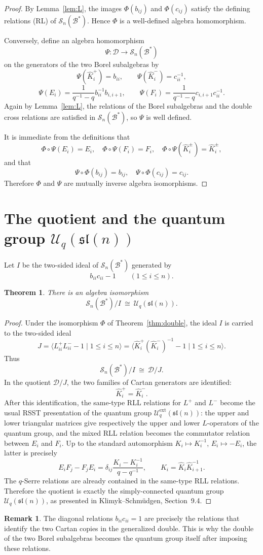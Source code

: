\documentclass{article}
\newtheorem{theorem}{Theorem}
\theoremstyle{definition}
\newtheorem{remark}{Remark}
\newcommand{\Uc}{\mathcal{U}}
\newcommand{\bcS}{\mathcal{S}}
\newcommand{\fB}{\mathcal{B}}
\newcommand{\fD}{\mathcal{D}}
\newcommand{\la}{\langle}
\newcommand{\ra}{\rangle}
\newcommand{\Khat}{\widehat K}
\newcommand{\q}{q}
\begin{document}
\begin{proof}
By Lemma~\ref{lem:L}, the images $\Phi(b_{ij})$ and $\Phi(c_{ij})$
satisfy the defining relations (RL) of $\bcS_n(\fB^*)$. Hence
$\Phi$ is a well-defined algebra homomorphism.

Conversely, define an algebra homomorphism
\[
\Psi:\fD\longrightarrow \bcS_n(\fB^*)
\]
on the generators of the two Borel subalgebras by
\[
\Psi(\Khat_i^+)=b_{ii},\qquad
\Psi(\Khat_i^-)=c_{ii}^{-1},
\]
\[
\Psi(E_i)=\frac{1}{\q^{-1}-\q} b_{ii}^{-1}b_{i,i+1},
\qquad
\Psi(F_i)=\frac{1}{\q^{-1}-\q} c_{i,i+1}c_{ii}^{-1}.
\]
Again by Lemma~\ref{lem:L}, the relations of the Borel subalgebras
and the double cross relations are satisfied in $\bcS_n(\fB^*)$, so
$\Psi$ is well defined.

It is immediate from the definitions that
\[
\Phi\circ \Psi(E_i)=E_i,\quad
\Phi\circ \Psi(F_i)=F_i,\quad
\Phi\circ \Psi(\Khat_i^\pm)=\Khat_i^\pm,
\]
and that
\[
\Psi\circ \Phi(b_{ij})=b_{ij},\quad
\Psi\circ \Phi(c_{ij})=c_{ij}.
\]
Therefore $\Phi$ and $\Psi$ are mutually inverse algebra isomorphisms.
\end{proof}

\section{The quotient and the quantum group $\Uc_q(\mathfrak{sl}(n))$}

Let $I$ be the two-sided ideal of $\bcS_n(\fB^*)$ generated by
\[
b_{ii}c_{ii}-1\qquad (1\leq i\leq n).
\]

\begin{theorem}\label{thm:quotient}
There is an algebra isomorphism
\[
\bcS_n(\fB^*)/I\ \cong\ \Uc_q(\mathfrak{sl}(n)).
\]
\end{theorem}

\begin{proof}
Under the isomorphism $\Phi$ of Theorem~\ref{thm:double}, the ideal
$I$ is carried to the two-sided ideal
\[
J=\bigl\la L^+_{ii}L^-_{ii}-1\mid 1\leq i\leq n\bigr\ra
=\bigl\la \Khat_i^+(\Khat_i^-)^{-1}-1\mid 1\leq i\leq n\bigr\ra.
\]
Thus
\[
\bcS_n(\fB^*)/I\ \cong\ \fD/J.
\]
In the quotient $\fD/J$, the two families of Cartan generators are
identified:
\[
\Khat_i^+=\Khat_i^-.
\]
After this identification, the same-type RLL relations for $L^+$ and
$L^-$ become the usual RSST presentation of the quantum group
$\Uc_q^{\mathrm{ext}}(\mathfrak{sl}(n))$: the upper and lower
triangular matrices give respectively the upper and lower
$L$-operators of the quantum group, and the mixed RLL relation becomes
the commutator relation between $E_i$ and $F_i$. Up to the standard
automorphism $K_i\mapsto K_i^{-1}$, $E_i\mapsto -E_i$, the latter is
precisely
\[
E_iF_j-F_jE_i
=\delta_{ij}\frac{K_i-K_i^{-1}}{\q-\q^{-1}},
\qquad
K_i=\Khat_i\Khat_{i+1}^{-1}.
\]
The $q$-Serre relations are already contained in the same-type RLL
relations. Therefore the quotient is exactly the simply-connected
quantum group $\Uc_q(\mathfrak{sl}(n))$, as presented in
Klimyk--Schm\"udgen, Section~9.4.
\end{proof}

\begin{remark}
The diagonal relations $b_{ii}c_{ii}=1$ are precisely the relations
that identify the two Cartan copies in the generalized double. This
is why the double of the two Borel subalgebras becomes the quantum
group itself after imposing these relations.
\end{remark}
\end{document}
